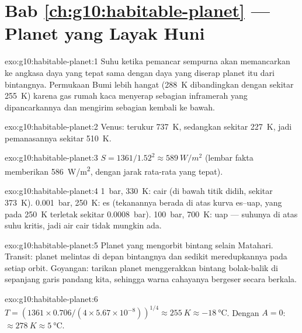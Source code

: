 \section*{Bab \ref{ch:g10:habitable-planet} --- Planet yang Layak Huni}

\begin{solution}{exo:g10:habitable-planet:1}
Suhu ketika pemancar sempurna akan memancarkan ke angkasa daya yang tepat sama
dengan daya yang diserap planet itu dari bintangnya. Permukaan Bumi lebih
hangat (\qty{288}{K} dibandingkan dengan sekitar \qty{255}{K}) karena gas
rumah kaca menyerap sebagian inframerah yang dipancarkannya dan mengirim
sebagian kembali ke bawah.
\end{solution}

\begin{solution}{exo:g10:habitable-planet:2}
Venus: terukur \qty{737}{K}, sedangkan  sekitar
\qty{227}{K}, jadi pemanasannya sekitar \qty{510}{K}.
\end{solution}

\begin{solution}{exo:g10:habitable-planet:3}
$S = 1361/1.52^2 \approx \qty{589}{W/m^2}$ (lembar fakta memberikan
\qty{586}{W/m^2}, dengan jarak rata-rata yang tepat).
\end{solution}

\begin{solution}{exo:g10:habitable-planet:4}
\qty{1}{bar}, \qty{330}{K}: cair (di bawah titik didih, sekitar
\qty{373}{K}). \qty{0.001}{bar}, \qty{250}{K}: es (tekanannya berada di atas
kurva es--uap, yang pada \qty{250}{K} terletak sekitar \qty{0.0008}{bar}).
\qty{100}{bar}, \qty{700}{K}: uap --- suhunya di atas suhu kritis, jadi air
cair tidak mungkin ada.
\end{solution}

\begin{solution}{exo:g10:habitable-planet:5}
Planet yang mengorbit bintang selain Matahari. Transit: planet melintas di
depan bintangnya dan sedikit meredupkannya pada setiap orbit. Goyangan:
tarikan planet menggerakkan bintang bolak-balik di sepanjang garis pandang
kita, sehingga warna cahayanya bergeser secara berkala.
\end{solution}

\begin{solution}{exo:g10:habitable-planet:6}
$T = (1361 \times 0.706/(4 \times 5.67\times10^{-8}))^{1/4} \approx
\qty{255}{K} \approx \qty{-18}{\degreeCelsius}$. Dengan $A = 0$:
$\approx \qty{278}{K} \approx \qty{5}{\degreeCelsius}$.
\end{solution}

